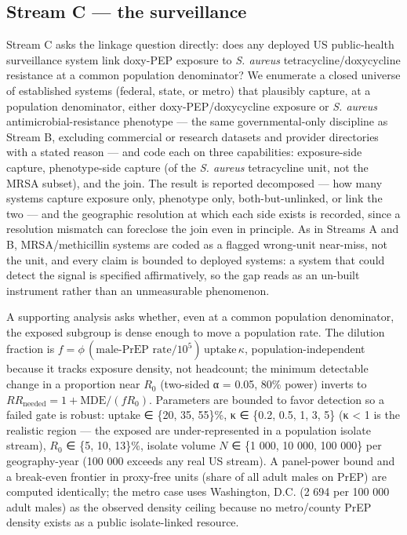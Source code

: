 \documentclass[10pt,letterpaper]{article}
\begin{document}
\subsection*{Stream C --- the surveillance}

Stream C asks the linkage question directly: does any deployed US
public-health surveillance system link doxy-PEP exposure to \emph{S.
aureus} tetracycline/doxycycline resistance at a common population
denominator? We enumerate a closed universe of established systems
(federal, state, or metro) that plausibly capture, at a population
denominator, either doxy-PEP/doxycycline exposure or \emph{S. aureus}
antimicrobial-resistance phenotype --- the same governmental-only
discipline as Stream B, excluding commercial or research datasets and
provider directories with a stated reason --- and code each on three
capabilities: exposure-side capture, phenotype-side capture (of the
\emph{S. aureus} tetracycline unit, not the MRSA subset), and the join.
The result is reported decomposed --- how many systems capture
exposure only, phenotype only, both-but-unlinked, or link the two ---
and the geographic resolution at which each side exists is recorded,
since a resolution mismatch can foreclose the join even in principle. As
in Streams A and B, MRSA/methicillin systems are coded as a flagged
wrong-unit near-miss, not the unit, and every claim is bounded to
deployed systems: a system that could detect the signal is
specified affirmatively, so the gap reads as an un-built instrument
rather than an unmeasurable phenomenon.

A supporting analysis asks whether, even at a common population
denominator, the exposed subgroup is dense enough to move a population
rate. The dilution fraction is \(f =
\phi\,(\text{male-PrEP rate}/10^5)\,\text{uptake}\,\kappa\),
population-independent because it tracks exposure density, not
headcount; the minimum detectable change in a proportion near \(R_0\)
(two-sided α = 0.05, 80\% power) inverts to \(RR_\text{needed} = 1 +
\text{MDE}/(f R_0)\). Parameters are bounded to favor detection
so a failed gate is robust: uptake ∈ \{20, 35, 55\}\%, κ ∈ \{0.2, 0.5,
1, 3, 5\} (κ \textless{} 1 is the realistic region --- the exposed are
under-represented in a population isolate stream), \(R_0\) ∈ \{5, 10,
13\}\%, isolate volume \(N\) ∈ \{1 000, 10 000, 100 000\} per
geography-year (100 000 exceeds any real US stream). A panel-power bound
and a break-even frontier in proxy-free units (share of all adult males
on PrEP) are computed identically; the metro case uses Washington, D.C.
(2 694 per 100 000 adult males) as the observed density ceiling because
no metro/county PrEP density exists as a public isolate-linked resource.
\end{document}
